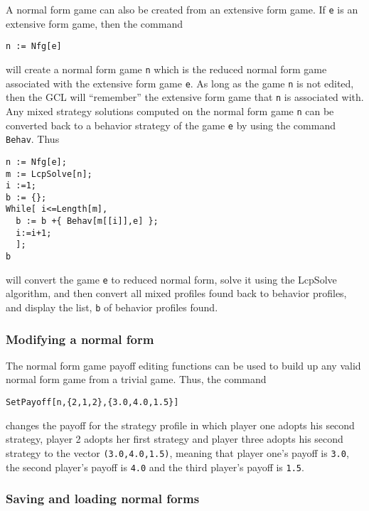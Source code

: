 A normal form game can also be created from an extensive form game.
If \verb+e+ is an extensive form game, then the command 

\begin{verbatim}
n := Nfg[e]
\end{verbatim}

\noindent
will create a normal form game \verb+n+ which is the reduced normal
form game associated with the extensive form game \verb+e+.  As long
as the game \verb+n+ is not edited, then the GCL will ``remember'' the
extensive form game that \verb+n+ is associated with.  Any mixed
strategy solutions computed on the normal form game \verb+n+ can be
converted back to a behavior strategy of the game \verb+e+ by using
the command \verb+Behav+.  Thus

\begin{verbatim}
n := Nfg[e];
m := LcpSolve[n];
i :=1;
b := {};
While[ i<=Length[m],
  b := b +{ Behav[m[[i]],e] };
  i:=i+1;
  ];
b
\end{verbatim}

\noindent
will convert the game \verb+e+ to reduced normal form, solve it using
the LcpSolve algorithm, and then convert all mixed profiles found back
to behavior profiles, and display the list, \verb+b+ of behavior
profiles found. 
  
\subsubsection{Modifying a normal form}

The normal form game payoff editing functions can be used to build up any
valid normal form game from a trivial game.  Thus, the command

\begin{verbatim}
SetPayoff[n,{2,1,2},{3.0,4.0,1.5}]
\end{verbatim}

\noindent
changes the payoff for the strategy profile in which player one adopts
his second strategy, player 2 adopts her first strategy and player
three adopts his second strategy to the vector \verb+(3.0,4.0,1.5)+,
meaning that player one's payoff is \verb+3.0+, the second player's
payoff is \verb+4.0+ and the third player's payoff is \verb+1.5+.

\subsubsection{Saving and loading normal forms}

